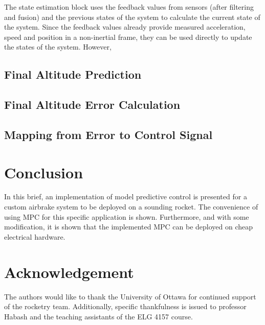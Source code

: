 \documentclass[conference, letterpaper]{IEEEtran}
\begin{document}
The state estimation block uses the feedback values from sensors (after filtering and fusion)
and the previous states of the system to calculate the current state of the system.
Since the feedback values already provide measured acceleration, speed and position
in a non-inertial frame, they can be used directly to update the states of the system.
However,


\subsection{Final Altitude Prediction}

\subsection{Final Altitude Error Calculation}

\subsection{Mapping from Error to Control Signal}

\section{Conclusion}

In this brief, an implementation of model predictive control is presented for a
custom airbrake system to be deployed on a sounding rocket. The convenience of
using MPC for this specific application is shown. Furthermore, and with some
modification, it is shown that the implemented MPC can be deployed on cheap electrical
hardware.

\section{Acknowledgement}

The authors would like to thank the University of Ottawa for continued support of the
rocketry team. Additionally, specific thankfulness is issued to professor Habash and
the teaching assistants of the ELG 4157 course.



\end{document}
